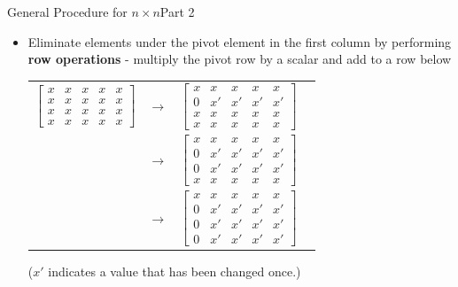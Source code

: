 \documentclass[10pt]{beamer}
\begin{document}
\begin{frame}[shrink]{General Procedure for $n\times n$}{Part 2}
\begin{itemize}
    \item[3.] Eliminate elements under the pivot element in the first column by performing \textbf{row operations} - multiply the pivot row by a scalar and add to a row below
\begin{center}
	\renewcommand{\arraystretch}{1.3}
	\footnotesize
	\begin{tabular}{cccc}
		$\begin{bmatrix}\boxed{x} & x & x & x & x \\
						   x  & x  & x  & x  & x  \\
						   x  & x  & x  & x  & x \\
						   x  & x  & x  & x  & x \end{bmatrix}$
		& $\longrightarrow$ &
		$\begin{bmatrix}\boxed{x} & x & x & x & x \\
						   0  & x' & x' & x' & x' \\
						   x  & x  & x  & x  & x \\
						   x  & x  & x  & x  & x \end{bmatrix}$ \\[10pt]
		& $\longrightarrow$ &
		$\begin{bmatrix}\boxed{x} & x & x & x & x \\
						   0  & x' & x' & x' & x' \\
						   0  & x' & x' & x' & x' \\
						   x  & x  & x  & x  & x \end{bmatrix}$ \\[10pt]
		& $\longrightarrow$ &
		$\begin{bmatrix}\boxed{x} & x & x & x & x \\
						   0  & x' & x' & x' & x' \\
						   0  & x' & x' & x' & x' \\
						   0  & x' & x' & x' & x'\end{bmatrix}$ &
	\end{tabular}
\end{center}
    ($x'$ indicates a value that has been changed once.)
\end{itemize}

\end{frame}
\end{document}
